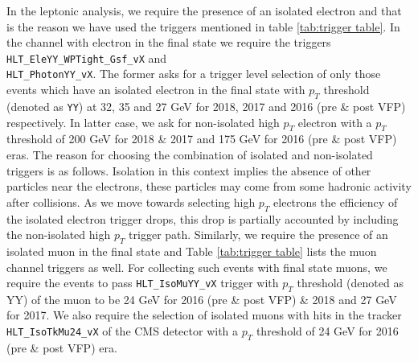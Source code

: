 In the leptonic analysis, we require the presence of an isolated electron and that is the reason we have used the triggers mentioned in table \ref{tab:trigger table}. In the channel with electron in the final state we require the triggers \verb|HLT_EleYY_WPTight_Gsf_vX| and \\ \verb|HLT_PhotonYY_vX|. The former asks for a trigger level selection of only those events which have an isolated electron in the final state with $p_{T}$ threshold (denoted as \verb|YY|) at 32, 35 and 27 GeV for 2018, 2017 and 2016 (pre \& post VFP) respectively. In latter case, we ask for non-isolated high $p_{T}$ electron with a $p_{T}$ threshold of 200 GeV for 2018 \& 2017 and 175 GeV for 2016 (pre \& post VFP) eras. The reason for choosing the combination of isolated and non-isolated triggers is as follows. Isolation in this context implies the absence of other particles near the electrons, these particles may come from some hadronic activity after collisions. As we move towards selecting high $p_{T}$ electrons the efficiency of the isolated electron trigger drops, this drop is partially accounted by including the non-isolated high $p_{T}$ trigger path. Similarly, we require the presence of an isolated muon in the final state and Table \ref{tab:trigger table} lists the muon channel triggers as well. For collecting such events with final state muons, we require the events to pass \verb|HLT_IsoMuYY_vX| trigger with $p_{T}$ threshold (denoted as YY) of the muon to be 24 GeV for 2016 (pre \& post VFP) \& 2018 and 27 GeV for 2017. We also require the selection of isolated muons with hits in the tracker \verb|HLT_IsoTkMu24_vX| of the CMS detector with a $p_{T}$ threshold of 24 GeV for 2016 (pre \& post VFP) era.

